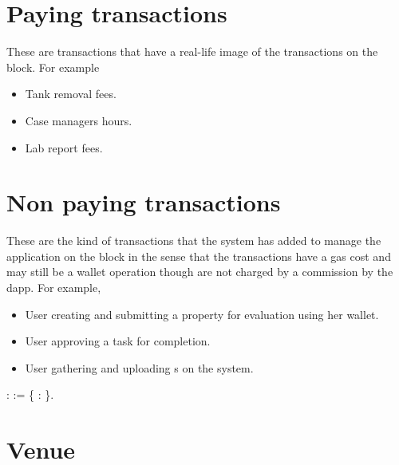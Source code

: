 \documentclass[12pt]{report}
\begin{document}
\section{Paying transactions}


  These are transactions that have a real-life image of the transactions on the block. For example

\begin{itemize}
\item  Tank removal fees.

\item  Case managers hours.

\item  Lab report fees.

\end{itemize}


\section{Non paying transactions}


  These are the kind of transactions that the system has added to manage the application on 
  the block in the sense that the transactions have a gas cost and may still be a wallet operation
  though are not charged by a commission by the dapp. For example, 

\begin{itemize}
\item  User creating and submitting a property for evaluation using her wallet.

\item  User approving a task for completion.

\item  User gathering and uploading s on the system.

\end{itemize}
\begin{coqdoccode}
\coqdocemptyline
\coqdocnoindent
{}  :  :=  \{ : \}.\coqdoceol
\coqdocemptyline
\end{coqdoccode}
\section{Venue}
\end{document}
